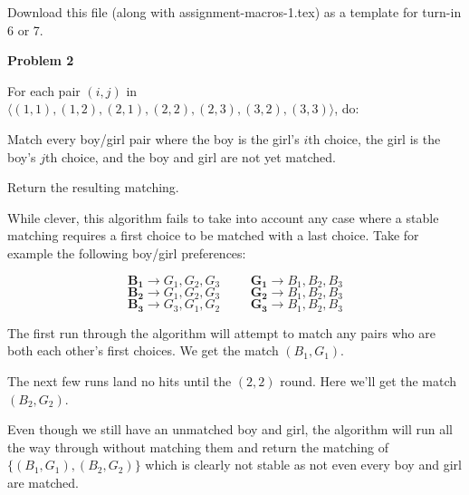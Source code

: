 \documentclass[11pt]{article}
\begin{document}
Download this file (along with \textsf{assignment-macros-1.tex}) as a template for turn-in 6 or 7.

\renewcommand{\problem}[1]{\item[\textbf{Problem #1}]}

\begin{problems}

  \problem{2}~

  \lineacross 

  \begin{steps}
    \step For each pair $(i,j)$ in $\langle (1,1), (1,2), (2,1), (2,2), (2,3), (3,2), (3,3) \rangle$, do:

    \begin{steps}
      \step Match every boy/girl pair where the boy is the girl's $i$th choice,
      the girl is the boy's $j$th choice, and the boy and girl are not yet matched.
    \end{steps}

    \step Return the resulting matching.
  \end{steps}
  
  \lineacross

  While clever, this algorithm fails to take into account any case where a stable matching requires a first choice to be matched with a last choice. Take for example the following boy/girl preferences:

  $$\mathbf{B_1} \rightarrow G_1, G_2, G_3 \hspace{1cm} \mathbf{G_1} \rightarrow B_1, B_2, B_3$$
  $$\mathbf{B_2} \rightarrow G_1, G_2, G_3 \hspace{1cm} \mathbf{G_2} \rightarrow B_1, B_2, B_3$$
  $$\mathbf{B_3} \rightarrow G_3, G_1, G_2 \hspace{1cm} \mathbf{G_3} \rightarrow B_1, B_2, B_3$$

  The first run through the algorithm will attempt to match any pairs who are both each other's first choices. We get the match $(B_1,G_1)$.

  The next few runs land no hits until the $(2,2)$ round. Here we'll get the match $(B_2,G_2)$.

  Even though we still have an unmatched boy and girl, the algorithm will run all the way through without matching them 
  and return the matching of $\{(B_1,G_1), (B_2,G_2)\}$ which is clearly not stable as not even every boy and girl are matched.


\end{problems}
\end{document}
